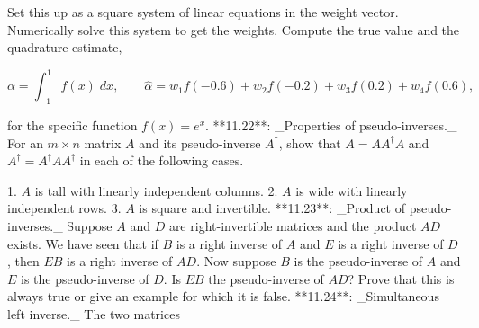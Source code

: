 Set this up as a square system of linear equations in the weight vector. Numerically solve this system to get the weights. Compute the true value and the quadrature estimate,

\[\alpha=\int_{-1}^{1}f(x)\;dx,\qquad\hat{\alpha}=w_{1}f(-0.6)+w_{2}f(-0.2)+w_{ 3}f(0.2)+w_{4}f(0.6),\]

for the specific function \(f(x)=e^{x}\).
**11.22**: _Properties of pseudo-inverses._ For an \(m\times n\) matrix \(A\) and its pseudo-inverse \(A^{\dagger}\), show that \(A=AA^{\dagger}A\) and \(A^{\dagger}=A^{\dagger}AA^{\dagger}\) in each of the following cases.

1. \(A\) is tall with linearly independent columns.
2. \(A\) is wide with linearly independent rows.
3. \(A\) is square and invertible.
**11.23**: _Product of pseudo-inverses._ Suppose \(A\) and \(D\) are right-invertible matrices and the product \(AD\) exists. We have seen that if \(B\) is a right inverse of \(A\) and \(E\) is a right inverse of \(D\), then \(EB\) is a right inverse of \(AD\). Now suppose \(B\) is the pseudo-inverse of \(A\) and \(E\) is the pseudo-inverse of \(D\). Is \(EB\) the pseudo-inverse of \(AD\)? Prove that this is always true or give an example for which it is false.
**11.24**: _Simultaneous left inverse._ The two matrices